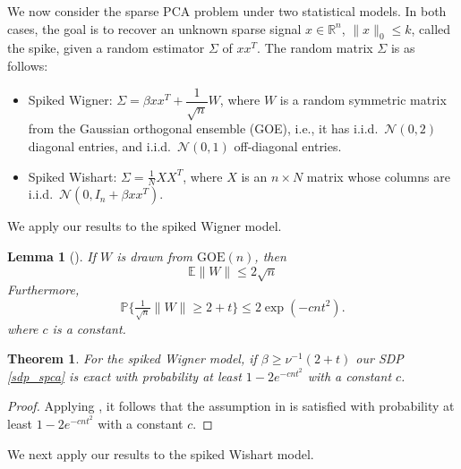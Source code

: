 \documentclass[11pt]{amsart}
\theoremstyle{plain}
\newtheorem{thm}{Theorem}[section]
\newtheorem{lem}{Lemma}[section]
\theoremstyle{definition}
\theoremstyle{remark}
\newcommand{\RR}{\mathbb{R}}
\begin{document}
	We now consider the sparse PCA problem under two statistical models.
	In both cases, the goal is to recover an unknown sparse signal $x\in\mathbb{\RR}^{n}$, $\|x\|_0\leq k$, called the spike, given a random estimator $\Sigma$ of $x x^T$.
	The random matrix $\Sigma$ is as follows:
	\begin{itemize}
		\item Spiked Wigner: $\Sigma = \beta xx^T + \dfrac{1}{\sqrt{n}}W$, where $W$ is a random symmetric matrix from the Gaussian orthogonal ensemble (GOE), i.e.,
		it has i.i.d.\ $\mathcal{N}(0,2)$ diagonal entries,
		and i.i.d.\ $\mathcal{N}(0,1)$ off-diagonal entries.
		\item Spiked Wishart: $\Sigma = \frac{1}{N}XX^T$, where $X$ is an $n\times N$ matrix whose columns are i.i.d.\ $\mathcal{N}(0, I_n +  \beta xx^T)$.
	\end{itemize}
	
	We apply our results to the spiked Wigner model.
	
	\begin{lem}[\cite{vershynin2018high}]\label{lem:GOE}
		If $W$ is drawn from $\mathrm{GOE}(n)$, then
		\[
		\mathbb{E}\|W\| \leq 2\sqrt{n}
		\]
		Furthermore, 
		\[
		\mathbb{P}\big\{\tfrac{1}{\sqrt{n}}\|W\|\geq 2 + t\big\} \leq 2\exp(-cnt^2).
		\]
		where $c$ is a constant.
	\end{lem}
	
	\begin{thm}
		For the spiked Wigner model, if \(\beta \geq \nu^{-1}(2 + t)\) our SDP \eqref{sdp_spca} is exact with probability at least  \(1 - 2e^{-cnt^2}\) with a constant \(c\).
	\end{thm}
	
	\begin{proof}
		Applying , it follows that the assumption in  is satisfied with probability at least  \(1 - 2e^{-cnt^2}\) with a constant \(c\).
	\end{proof}
	
	We next apply our results to the spiked Wishart model.
	
\end{document}
